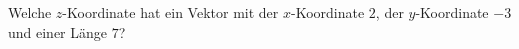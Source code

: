 \begin{ExerciseBlock}
Welche $z$-Koordinate hat ein Vektor mit der $x$-Koordinate $2$, der $y$-Koordinate $-3$ und einer Länge $7$?

\end{ExerciseBlock}
